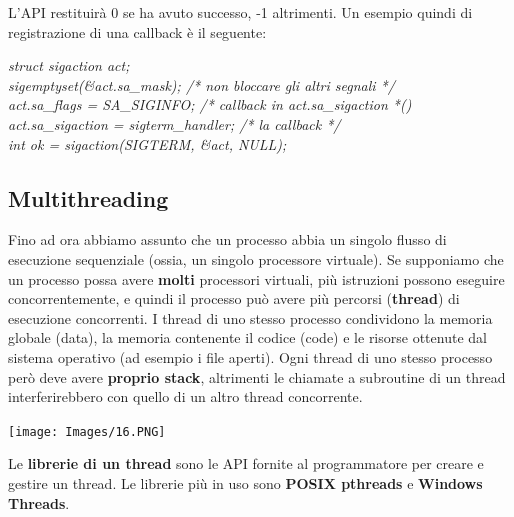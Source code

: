 \documentclass[12pt]{article}
\begin{document}
L'API restituirà 0 se ha avuto successo, -1 altrimenti.
Un esempio quindi di registrazione di una callback è il seguente:
\begin{center}
    \textit{struct sigaction act;} \\
    \textit{sigemptyset(\textnormal{\&}act.sa\_mask); /* non bloccare gli altri segnali */} \\
    \textit{act.sa\_flags = SA\_SIGINFO; /* callback in act.sa\_sigaction *()} \\
    \textit{act.sa\_sigaction = sigterm\_handler; /* la callback */} \\
    \textit{int ok = sigaction(SIGTERM, \textnormal{\&}act, NULL);}
\end{center}
\subsection{Multithreading}
Fino ad ora abbiamo assunto che un processo abbia un singolo flusso di esecuzione sequenziale (ossia, un singolo processore virtuale).
Se supponiamo che un processo possa avere \textbf{molti} processori virtuali, più istruzioni possono eseguire concorrentemente, e quindi il processo può avere più percorsi
(\textbf{thread}) di esecuzione concorrenti.
I thread di uno stesso processo condividono la memoria globale (data), la memoria contenente il codice (code) e le risorse ottenute dal sistema operativo (ad esempio i file aperti).
Ogni thread di uno stesso processo però deve avere \textbf{proprio stack}, altrimenti le chiamate a subroutine di un thread interferirebbero con quello di un altro thread concorrente.
\begin{center}
    \texttt{[image: Images/16.PNG]}
\end{center}
Le \textbf{librerie di un thread} sono le API fornite al programmatore per creare e gestire un thread.
Le librerie più in uso sono \textbf{POSIX pthreads} e \textbf{Windows Threads}.
\end{document}
